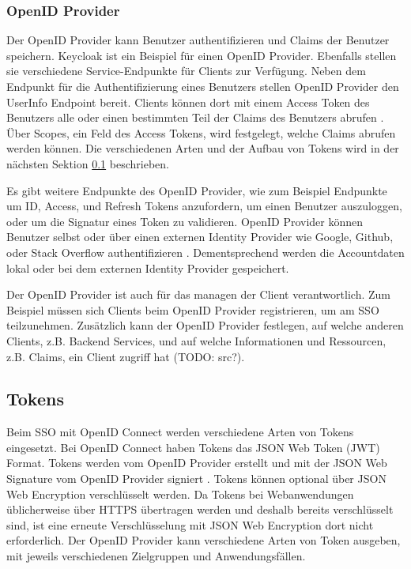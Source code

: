 \subsubsection{OpenID Provider}

Der OpenID Provider kann Benutzer authentifizieren und Claims der Benutzer speichern. Keycloak ist ein Beispiel für einen OpenID Provider. Ebenfalls stellen sie verschiedene Service-Endpunkte für Clients zur Verfügung. Neben dem Endpunkt für die Authentifizierung eines Benutzers stellen OpenID Provider den UserInfo Endpoint bereit. Clients können dort mit einem Access Token des Benutzers alle oder einen bestimmten Teil der Claims des Benutzers abrufen \cite{EB4}. Über Scopes, ein Feld des Access Tokens, wird festgelegt, welche Claims abrufen werden können. Die verschiedenen Arten und der Aufbau von Tokens wird in der nächsten Sektion \ref{EB_Tokens} beschrieben.

Es gibt weitere Endpunkte des OpenID Provider, wie zum Beispiel Endpunkte um ID, Access, und Refresh Tokens anzufordern, um einen Benutzer auszuloggen, oder um die Signatur eines Token zu validieren. OpenID Provider können Benutzer selbst oder über einen externen Identity Provider wie Google, Github, oder Stack Overflow authentifizieren \cite{EB7} \cite{EB6}. Dementsprechend werden die Accountdaten lokal oder bei dem externen Identity Provider gespeichert.

Der OpenID Provider ist auch für das managen der Client verantwortlich. Zum Beispiel müssen sich Clients beim OpenID Provider registrieren, um am SSO teilzunehmen. Zusätzlich kann der OpenID Provider festlegen, auf welche anderen Clients, z.B. Backend Services, und auf welche Informationen und Ressourcen, z.B. Claims, ein Client zugriff hat (TODO: src?).


\subsection{Tokens} \label{EB_Tokens}

Beim SSO mit OpenID Connect werden verschiedene Arten von Tokens eingesetzt. Bei OpenID Connect haben Tokens das JSON Web Token (JWT) Format. Tokens werden vom OpenID Provider erstellt und mit der JSON Web Signature vom OpenID Provider signiert \cite{EB5}. Tokens können optional über JSON Web Encryption verschlüsselt werden. Da Tokens bei Webanwendungen üblicherweise über HTTPS übertragen werden und deshalb bereits verschlüsselt sind, ist eine erneute Verschlüsselung mit JSON Web Encryption dort nicht erforderlich. Der OpenID Provider kann verschiedene Arten von Token ausgeben, mit jeweils verschiedenen Zielgruppen und Anwendungsfällen.

